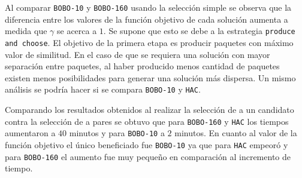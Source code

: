 Al comparar \texttt{BOBO-10} y \texttt{BOBO-160} usando la selección simple se observa que la diferencia entre los valores de la función objetivo de cada solución aumenta a medida que $\gamma$ se acerca a $1$. Se supone que esto se debe a la estrategia \texttt{produce and choose}. El objetivo de la primera etapa es producir paquetes con máximo valor de similitud. En el caso de que se requiera una solución con mayor separación entre paquetes, al haber producido menos cantidad de paquetes existen menos posibilidades para generar una solución más dispersa. Un mismo análisis se podría hacer si se compara \texttt{BOBO-10} y \texttt{HAC}.

Comparando los resultados obtenidos al realizar la selección de a un candidato contra la selección de a pares se obtuvo que para \texttt{BOBO-160} y \texttt{HAC} los tiempos aumentaron a $40$ minutos y para \texttt{BOBO-10} a $2$ minutos. En cuanto al valor de la función objetivo el único beneficiado fue \texttt{BOBO-10} ya que para \texttt{HAC} empeoró y para \texttt{BOBO-160} el aumento fue muy pequeño en comparación al incremento de tiempo.